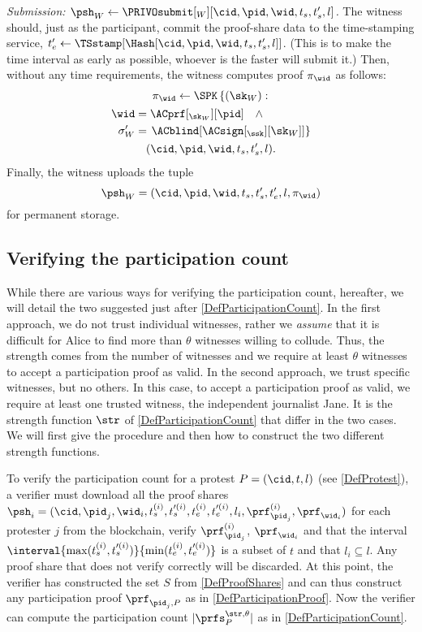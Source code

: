 \emph{Submission: \(\psh_W\gets \PRIVOsubmit[_W][\cid, \pid, \wid, t_s, t_s', 
    l]\).}
The witness should, just as the participant, commit the proof-share data to the 
time-stamping service, \(t_e'\gets \TSstamp[\Hash[\cid, \pid, \wid, t_s, t_s', 
  l]]\).
(This is to make the time interval as early as possible, whoever is the faster 
will submit it.)
Then, without any time requirements, the witness computes  proof 
\(\pi_{\wid}\) as follows:
\begin{multline*}
  \pi_{\wid}\gets \SPK\left\{ (\sk_W) : \right. \\
    \begin{aligned}
      \wid &= \ACprf[_{\sk_W}][\pid] \quad \land \\
      \sigma_W' &= \left. \ACblind[\ACsign[_{\ssk}][\sk_W]] \right\}
    \end{aligned} \\
      (\cid, \pid, \wid, t_s, t_s', l).
\end{multline*}
Finally, the witness uploads the tuple \[ \psh_W = (\cid, \pid, \wid, t_s, 
  t_s', t_e', l, \pi_{\wid}) \] for permanent storage.

\subsection{Verifying the participation count}%
\label{ProtocolVerification}

While there are various ways for verifying the participation count, hereafter, 
we will detail the two suggested just after \cref{DefParticipationCount}.
In the first approach, we do not trust individual witnesses, rather we \emph{assume} that it is difficult for Alice to find more than \(\theta\) witnesses willing to collude.
Thus, the strength comes from the number of witnesses and we require at least \(\theta\) witnesses to accept a participation proof as valid.
In the second approach, we trust specific witnesses, but no others.
In this case, to accept a participation proof as valid, we require at least one trusted witness, the independent journalist Jane.
It is the strength function \(\str\) of \cref{DefParticipationCount} that 
differ in the two cases.
We will first give the procedure and then how to construct the two different 
strength functions.

To verify the participation count for a protest \(P = (\cid, t, l)\) (see 
\cref{DefProtest}), a verifier must download all the proof shares \(\psh_i =   
  (\cid, \pid_j, \wid_i, t_s^{(i)}, t_s^{\prime (i)}, t_e^{(i)}, t_e^{\prime   
    (i)}, l_i, \prf_{\pid_j}^{(i)}, \prf_{\wid_i})\) for each protester \(j\) 
from the blockchain, verify \(\prf_{\pid_j}^{(i)}\), \(\prf_{\wid_i}\) and that 
the interval \(\interval{\max(t_s^{(i)}, t_s^{\prime (i)})}{\min(t_e^{(i)}, 
    t_e^{\prime (i)})}\) is a subset of \(t\) and that \(l_i\subseteq  l\).
Any proof share that does not verify correctly will be discarded.
At this point, the verifier has constructed the set \(S\) from 
\cref{DefProofShares} and can thus construct any participation proof 
\(\prf_{\pid_j, P}\) as in \cref{DefParticipationProof}.
Now the verifier can compute the participation count \(|\prfs_P^{\str, 
    \theta}|\) as in \cref{DefParticipationCount}.

